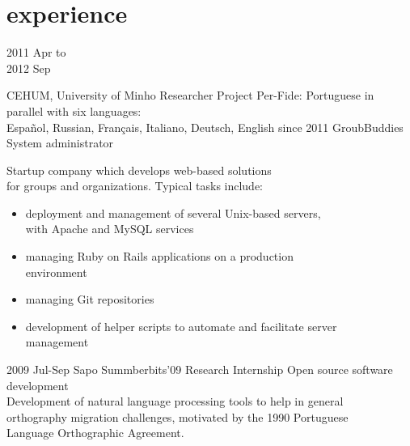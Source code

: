 \documentclass[a4paper]{friggeri-cv}
\begin{document}
\section{experience}
\begin{entrylist}
  \entry
    {\parbox[t][][t]{3cm}{2011 {\footnotesize Apr to}\\2012 {\footnotesize Sep}}}
    {CEHUM, University of Minho}
    {Researcher}
    {Project Per-Fide: Portuguese in parallel with six languages:\\
	Español, Russian, Français, Italiano, Deutsch, English}
  \entry
    {{\footnotesize since} 2011}
    {GroubBuddies}
    {System administrator}
    {
	Startup company which develops web-based solutions\\
	for groups and organizations. Typical tasks include:
		\footnotesize{
		\begin{itemize}
			\item deployment and management of several Unix-based servers,\\ 
			with Apache and MySQL services
			\item managing Ruby on Rails applications on a production\\
			environment
			\item managing Git repositories
			\item development of helper scripts to automate and facilitate server\\
			management
			\end{itemize}
	}}
  \entry
    {2009 {\footnotesize Jul-Sep}}
    {Sapo Summberbits'09}
    {Research Internship}
    {Open source software development\\
	\footnotesize{
	Development of natural language processing tools to help in general\\
	orthography migration challenges, motivated by the 1990 Portuguese\\
	Language Orthographic Agreement.}}
\end{entrylist}
\end{document}
